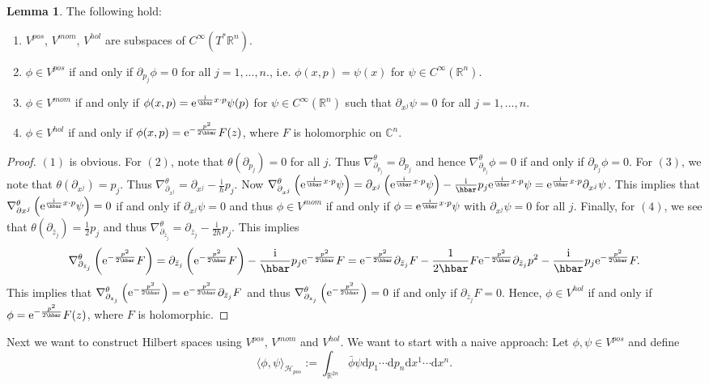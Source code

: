 \documentclass[12pt]{amsart}
\numberwithin{equation}{section}
\theoremstyle{plain}
\theoremstyle{definition}
\newtheorem{lem}{Lemma}[subsection]
\theoremstyle{remark}
\newcommand{\R}{\mathbb{R}}
\newcommand{\dd}{{\mathrm{d}}}
\newcommand{\calH}{\mathcal{H}}
\newcommand{\I}{\mathrm{i}}
\newcommand{\ee}{\textnormal{e}}
\begin{document}
\begin{lem}
The following hold:
\begin{enumerate}
\item{$V^{pos}$, $V^{mom}$, $V^{hol}$ are subspaces of $C^\infty(T^*\R^n)$.
}
\item{$\phi\in V^{pos}$ if and only if $\partial_{p_j}\phi=0$ for all $j=1,...,n$., i.e. $\phi(x,p)=\psi(x)$ for $\psi\in C^\infty(\R^n)$.
}
\item{$\phi\in V^{mom}$ if and only if $\phi(x,p)=\ee^{\frac{\I}{\hbar}x\cdot p}\psi(p)$ for $\psi\in C^\infty(\R^n)$ such that $\partial_{x^j}\psi=0$ for all $j=1,...,n$.
}
\item{$\phi\in V^{hol}$ if and only if $\phi(x,p)=\ee^{-\frac{p^2}{2\hbar}}F(z)$, where $F$ is holomorphic on $\mathbb{C}^n$.

}
\end{enumerate}
\end{lem}

\begin{proof}
$(1)$ is obvious. For $(2)$, note that $\theta(\partial_{p_j})=0$ for all $j$. Thus $\nabla_{\partial_{p_j}}^\theta=\partial_{p_j}$ and hence $\nabla_{\partial_{p_j}}^\theta\phi=0$ if and only if $\partial_{p_j}\phi=0$. For $(3)$, we note that $\theta(\partial_{x^j})=p_j$. Thus $\nabla_{\partial_{x^j}}^\theta=\partial_{x^j}-\frac{\I}{\hbar}p_j$. Now $\nabla_{\partial_{x^j}}^\theta\left(\ee^{\frac{\I}{\hbar}x\cdot p}\psi\right)=\partial_{x^j}\left(\ee^{\frac{\I}{\hbar}x\cdot p}\psi\right)-\frac{\I}{\hbar}p_j\ee^{\frac{\I}{\hbar}x\cdot p}\psi=\ee^{\frac{\I}{\hbar}x\cdot p}\partial_{x^j}\psi$. This implies that $\nabla_{\partial x^j}^\theta\left(\ee^{\frac{\I}{\hbar}x\cdot p}\psi\right)=0$ if and only if $\partial_{x^j}\psi=0$ and thus $\phi\in V^{mom}$ if and only if $\phi=\ee^{\frac{\I}{\hbar}x\cdot p}\psi$ with $\partial_{x^j}\psi=0$ for all $j$. Finally, for $(4)$, we see that $\theta(\partial_{\bar z_j})=\frac{1}{2}p_j$ and thus $\nabla_{\partial_{\bar z_j}}^\theta=\partial_{\bar z_j}-\frac{\I}{2\hbar}p_j$. This implies 
$$\nabla_{\partial_{\bar z_j}}^\theta\left(\ee^{-\frac{p^2}{2\hbar}}F\right)=\partial_{\bar z_j}\left(\ee^{-\frac{p^2}{2\hbar}}F\right)-\frac{\I}{\hbar}p_j\ee^{-\frac{p^2}{2\hbar}}F=\ee^{-\frac{p^2}{2\hbar}}\partial_{\bar z_j}F-\frac{1}{2\hbar}F\ee^{-\frac{p^2}{2\hbar}}\partial_{\bar z_j}p^2-\frac{\I}{\hbar}p_j\ee^{-\frac{p^2}{2\hbar}}F.$$
This implies that $\nabla_{\partial_{z_j}}^\theta\left(\ee^{-\frac{p^2}{2\hbar}}\right)=\ee^{-\frac{p^2}{2\hbar}}\partial_{\bar z_j}F$ and thus $\nabla_{\partial_{z_j}}^\theta\left(\ee^{-\frac{p^2}{2\hbar}}\right)=0$ if and only if $\partial_{\bar z_j}F=0$. Hence, $\phi\in V^{hol}$ if and only if $\phi=\ee^{-\frac{p^2}{2\hbar}}F(z)$, where $F$ is holomorphic.
\end{proof}
Next we want to construct Hilbert spaces using $V^{pos}$, $V^{mom}$ and $V^{hol}$. We want to start with a naive approach: Let $\phi,\psi\in V^{pos}$ and define 
\begin{equation}
\label{inner_prod}
\langle \phi,\psi\rangle_{\calH_{pos}}:=\int_{\R^{2n}}\bar\phi\psi\dd p_1\dotsm\dd p_n\dd x^{1}\dotsm\dd x^n.
\end{equation}
\end{document}
